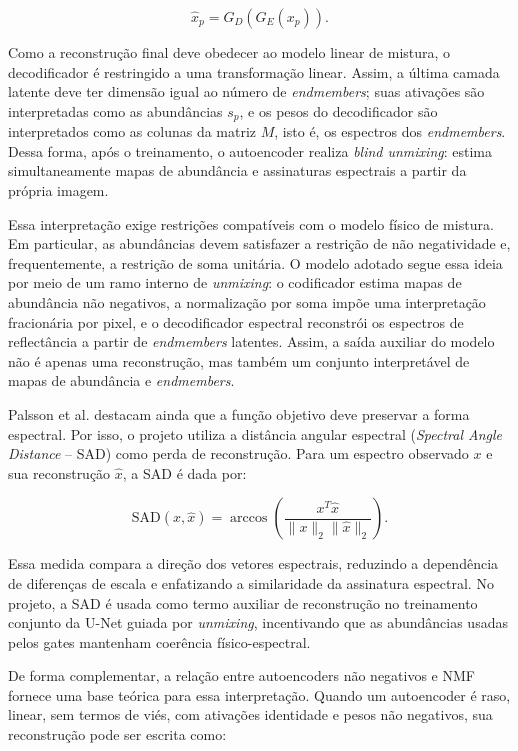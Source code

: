 \documentclass[conference]{IEEEtran}
\begin{document}
\[
\hat{x}_p = G_D(G_E(x_p)).
\]

Como a reconstrução final deve obedecer ao modelo linear de mistura, o
decodificador é restringido a uma transformação linear. Assim, a última camada
latente deve ter dimensão igual ao número de \textit{endmembers}; suas ativações
são interpretadas como as abundâncias $s_p$, e os pesos do decodificador são
interpretados como as colunas da matriz $M$, isto é, os espectros dos
\textit{endmembers}. Dessa forma, após o treinamento, o autoencoder realiza
\textit{blind unmixing}: estima simultaneamente mapas de abundância e assinaturas
espectrais a partir da própria imagem.

Essa interpretação exige restrições compatíveis com o modelo físico de mistura.
Em particular, as abundâncias devem satisfazer a restrição de não negatividade e,
frequentemente, a restrição de soma unitária. O modelo adotado segue essa
ideia por meio de um ramo interno de \textit{unmixing}: o codificador estima
mapas de abundância não negativos, a normalização por soma impõe uma
interpretação fracionária por pixel, e o decodificador espectral reconstrói os
espectros de reflectância a partir de \textit{endmembers} latentes. Assim, a
saída auxiliar do modelo não é apenas uma reconstrução, mas também um conjunto
interpretável de mapas de abundância e \textit{endmembers}.

Palsson et al. \cite{palsson2018autoencoder} destacam ainda que a função
objetivo deve preservar a forma espectral. Por isso, o projeto utiliza a
distância angular espectral (\textit{Spectral Angle Distance} -- SAD) como perda
de reconstrução. Para um espectro observado $x$ e sua reconstrução $\hat{x}$, a
SAD é dada por:

\[
\mathrm{SAD}(x,\hat{x}) =
\arccos\left(\frac{x^{T}\hat{x}}{\|x\|_2\|\hat{x}\|_2}\right).
\]

Essa medida compara a direção dos vetores espectrais, reduzindo a dependência de
diferenças de escala e enfatizando a similaridade da assinatura espectral. No
projeto, a SAD é usada como termo auxiliar de reconstrução no treinamento
conjunto da U-Net guiada por \textit{unmixing}, incentivando que as abundâncias
usadas pelos gates mantenham coerência físico-espectral.

De forma complementar, a relação entre autoencoders não negativos e NMF fornece
uma base teórica para essa interpretação. Quando um autoencoder é raso, linear,
sem termos de viés, com ativações identidade e pesos não negativos, sua
reconstrução pode ser escrita como:
\end{document}
